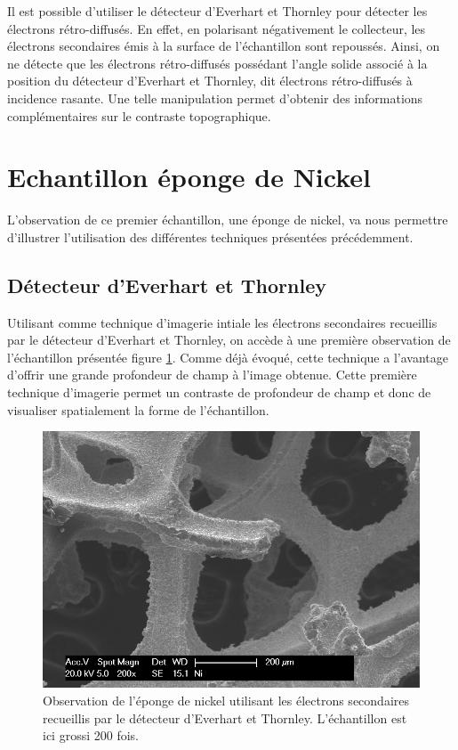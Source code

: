 \documentclass[a4paper,12pt]{article}
\newcommand\ett{Everhart et Thornley\xspace}
\begin{document}
Il est possible d'utiliser le détecteur d'\ett  pour détecter les électrons rétro-diffusés.
En effet, en polarisant négativement le collecteur, les électrons secondaires émis à la surface de l'échantillon sont repoussés.
Ainsi, on ne détecte que les électrons rétro-diffusés possédant l'angle solide associé à la position du détecteur d'\ett, dit électrons rétro-diffusés à incidence rasante.
Une telle manipulation permet d'obtenir des informations complémentaires sur le contraste topographique.


\section{Echantillon éponge de Nickel}

L'observation de ce premier échantillon, une éponge de nickel, va nous permettre d'illustrer l'utilisation des différentes techniques présentées précédemment.

\subsection{Détecteur d'\ett}

Utilisant comme technique d'imagerie intiale les électrons secondaires recueillis par le détecteur d'\ett,
on accède à une première observation de l'échantillon présentée figure \ref{fig:ni_es}. Comme déjà évoqué,
cette technique a l'avantage d'offrir une grande profondeur de champ à l'image obtenue. Cette première
technique d'imagerie permet un contraste de profondeur de champ et donc de visualiser spatialement la forme
de l'échantillon.

\begin{figure}
\centering
\includegraphics[width = 0.7 \textwidth]{images/ni_es.png}
\caption{Observation de l'éponge de nickel utilisant les électrons secondaires recueillis par le détecteur d'\ett. L'échantillon est ici grossi 200 fois.}
\label{fig:ni_es}
\end{figure}
\end{document}
